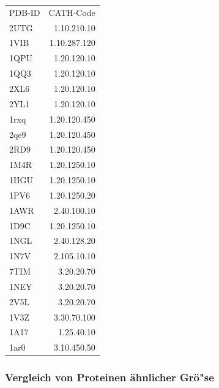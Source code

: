 \documentclass{report}
\begin{document}
\begin{tabular}{l r}

PDB-ID & CATH-Code  \\
2UTG & 1.10.210.10  \\ %
1VIB & 1.10.287.120 \\ %
1QPU & 1.20.120.10  \\ %
1QQ3 & 1.20.120.10  \\ %
2XL6 & 1.20.120.10  \\ %
2YL1 & 1.20.120.10  \\ %
1rxq & 1.20.120.450 \\ %
2qe9 & 1.20.120.450 \\ %
2RD9 & 1.20.120.450 \\ %
1M4R & 1.20.1250.10 \\ %
1HGU & 1.20.1250.10 \\ %
1PV6 & 1.20.1250.20 \\ %
1AWR & 2.40.100.10  \\ %
1D9C & 1.20.1250.10 \\ %
1NGL & 2.40.128.20  \\ %
1N7V & 2.105.10.10  \\ %
7TIM & 3.20.20.70   \\ %
1NEY & 3.20.20.70   \\ %
2V5L & 3.20.20.70   \\ %
1V3Z & 3.30.70.100  \\ %
1A17 & 1.25.40.10   \\ %
1ar0 & 3.10.450.50  \\ %

\end{tabular}

\subsubsection{Vergleich von Proteinen \"ahnlicher Gr\"o"se}
\end{document}

